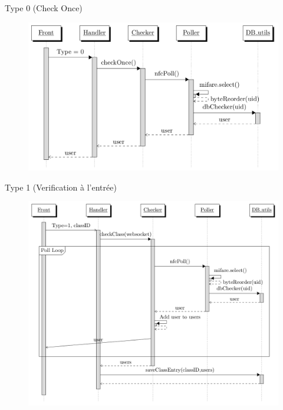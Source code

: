 \documentclass[aspectratio=169]{beamer}
\begin{document}
\begin{frame}{Type 0 (Check Once)}
  \begin{figure}[]
    \includegraphics[height=.9\textheight]{../assets/nfcSeqOnce.png}
  \end{figure}

\end{frame}

\begin{frame}{Type 1 (Verification à l'entrée)}
  \begin{figure}[]
    \includegraphics[height=.9\textheight]{../assets/nfcSeqEntry.png}
  \end{figure}

\end{frame}
\end{document}
